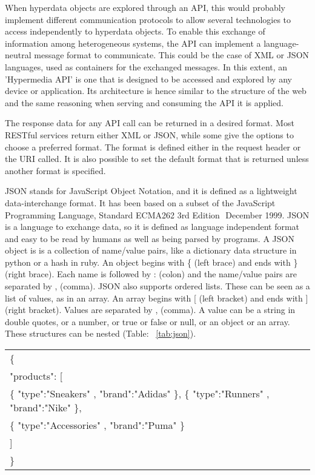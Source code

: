 When hyperdata objects are explored through an API, this would probably implement different communication protocols to allow several technologies to access independently to hyperdata objects. To enable this exchange of information among heterogeneous systems, the API can implement a language­-neutral message format to communicate. This could be the case of XML or JSON languages, used as containers for the exchanged messages. In this extent, an 'Hypermedia API' is one that is designed to be accessed and explored by any device or application. Its architecture is hence similar to the structure of the web and the same reasoning when serving and consuming the API it is applied. 

The response data for any API call can be returned in a desired format. Most RESTful services return either XML or JSON, while some give the options to choose a preferred format. The format is defined either in the request header or the URI called. It is also possible to set the default format that is returned unless another format is specified.

JSON stands for JavaScript Object Notation, and it is defined as a lightweight data-interchange format. It has been based on a subset of the JavaScript Programming Language, Standard ECMA­262 3rd Edition ­ December 1999. JSON is a language to exchange data, so it is defined as language independent format and easy to be read by humans as well as being parsed by programs. A JSON object is is a collection of name/value pairs, like a dictionary data structure in python or a hash in ruby. An object begins with \{ (left brace) and ends with \} (right brace). Each name is followed by : (colon) and the name/value pairs are separated by , (comma). JSON also supports ordered lists. These can be seen as a list of values, as in an array. An array begins with [ (left bracket) and ends with ] (right bracket). Values are separated by , (comma). A value can be a string in double quotes, or a number, or true or false or null, or an object or an array. These structures can be nested (Table: ~\ref{tab:json}).

\begin{table*}[ht]
\centering
\begin{tabular}{| l |}
\hline
\{\\
"products": [\\
\{ "type":"Sneakers" , "brand":"Adidas" \}, \{ "type":"Runners" , "brand":"Nike" \},\\
\{ "type":"Accessories" , "brand":"Puma" \}\\
]\\ \}\\
\hline
\end{tabular}
\caption{A JSON example}
\label{tab:json}
\end{table*}

